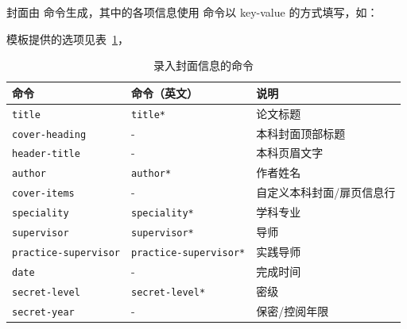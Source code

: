 \documentclass[a4paper]{ltxdoc}
\DeclareRobustCommand\opt{\texttt}
\begin{document}
\DescribeMacro{\maketitle}
封面由  命令生成，其中的各项信息使用  命令以
key-value 的方式填写，如：
\begin{latex}
\end{latex}
模板提供的选项见表~\ref{tab:covercmds}，
\begin{table}[htb]
  \centering\small
  \caption{录入封面信息的命令}
  \label{tab:covercmds}
  \begin{tabular}{lll}
    \toprule
    命令               & 命令（英文）        & 说明          \\
    \midrule
    \opt{title}        & \opt{title*}        & 论文标题      \\
    \opt{cover-heading} & -                  & 本科封面顶部标题 \\
    \opt{header-title} & -                   & 本科页眉文字 \\
    \opt{author}       & \opt{author*}       & 作者姓名      \\
    \opt{cover-items}  & -                   & 自定义本科封面/扉页信息行 \\
    \opt{speciality}   & \opt{speciality*}   & 学科专业      \\
    \opt{supervisor}   & \opt{supervisor*}   & 导师      \\
    \opt{practice-supervisor} & \opt{practice-supervisor*} & 实践导师 \\
    \opt{date}         & -                   & 完成时间      \\
    \opt{secret-level} & \opt{secret-level*} & 密级          \\
    \opt{secret-year}  & -                   & 保密/控阅年限 \\
    \bottomrule
  \end{tabular}
\end{table}
\end{document}
